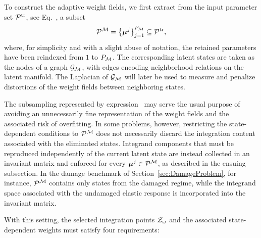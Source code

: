 \documentclass[preprint,10pt]{elsarticle}  %
\begin{document}
To construct the adaptive weight fields, we first extract from the
input parameter set $\mathcal{P}^{\textrm{tr}}$, see Eq.~, a   subset
\begin{equation}
\label{eq:PmuM_definition}
\mathcal{P}^{\mathcal{M}}
=
\left\{\bm{\mu}^{j}\right\}_{j=1}^{P_{\mathcal{M}}}
\subseteq
\mathcal{P}^{\textrm{tr}},
\end{equation}
where, for simplicity and with a slight abuse of notation, the retained
parameters have been reindexed from \(1\) to \(P_{\mathcal{M}}\). The corresponding
latent states are taken as the nodes of a graph \(\mathcal{G}_{\mathcal{M}}\), with edges
encoding neighborhood relations on the latent manifold.  The Laplacian of
\(\mathcal{G}_{\mathcal{M}}\) will later be used to measure and penalize distortions of the
weight fields between neighboring states.


The subsampling represented by expression~   may serve the usual
purpose of avoiding an unnecessarily fine representation of the weight
fields and the associated risk of overfitting. In some problems,
however,  restricting the
state-dependent conditions to \(\mathcal{P}^{\mathcal{M}}\) does not necessarily discard
the integration content associated with the eliminated states.
Integrand components that must be reproduced independently of the
current latent state are instead collected in an invariant matrix and
enforced for every \(\bm{\mu}^{j}\in\mathcal{P}^{\mathcal{M}}\), as described in the ensuing
subsection.   In the damage benchmark of Section~\ref{sec:DamageProblem}, for
instance, \(\mathcal{P}^{\mathcal{M}}\) contains only states from the damaged regime, while
the integrand space associated with the undamaged elastic response is
incorporated into the invariant matrix.



With this setting, the  selected integration points $\mathcal{Z}_{\omega}$ and the associated state-dependent weights  must satisfy four requirements:
\end{document}
